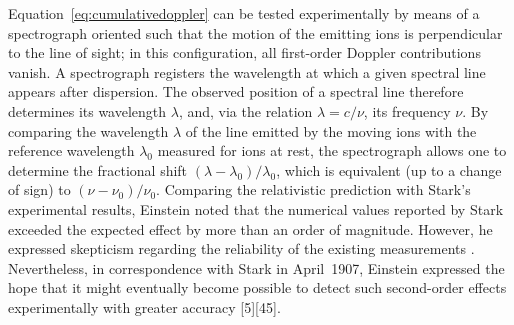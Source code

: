 \documentclass[submitted,12pt]{article}
\begin{document}
Equation~\eqref{eq:cumulativedoppler} can be tested experimentally by means of a spectrograph oriented such that the motion of the emitting ions is perpendicular to the line of sight; in this configuration, all first-order Doppler contributions vanish. A spectrograph registers the wavelength at which a given spectral line appears after dispersion. The observed position of a spectral line therefore determines its wavelength $\lambda$, and, via the relation $\lambda = c/\nu$, its frequency $\nu$. By comparing the wavelength $\lambda$ of the line emitted by the moving ions with the reference wavelength $\lambda_0$ measured for ions at rest, the spectrograph allows one to determine the fractional shift $(\lambda-\lambda_0)/\lambda_0$, which is equivalent (up to a change of sign) to $(\nu-\nu_0)/\nu_0$. Comparing the relativistic prediction with Stark’s experimental results, Einstein noted that the numerical values reported by Stark exceeded the expected effect by more than an order of magnitude. However, he expressed skepticism regarding the reliability of the existing measurements \citep[198]{Einstein1907d}. Nevertheless, in correspondence with Stark in April~1907, Einstein expressed the hope that it might eventually become possible to detect such second-order effects experimentally with greater accuracy [5][45].



\end{document}

